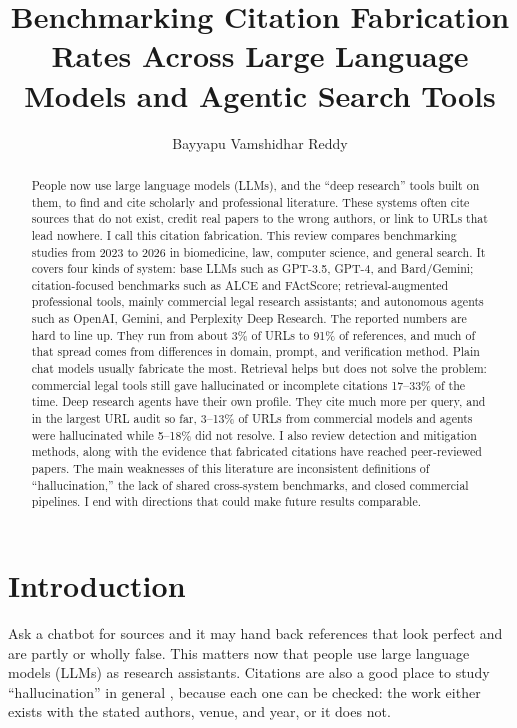 \documentclass[acmsmall,screen]{acmart}
\title{Benchmarking Citation Fabrication Rates Across Large Language Models and Agentic Search Tools}
\author{Bayyapu Vamshidhar Reddy}
\affiliation{\institution{Indian Institute of Information Technology Allahabad}\city{Prayagraj}\country{India}}
\begin{document}
\begin{abstract}
People now use large language models (LLMs), and the ``deep research'' tools built on them, to find and cite scholarly and professional literature. These systems often cite sources that do not exist, credit real papers to the wrong authors, or link to URLs that lead nowhere. I call this citation fabrication. This review compares benchmarking studies from 2023 to 2026 in biomedicine, law, computer science, and general search. It covers four kinds of system: base LLMs such as GPT-3.5, GPT-4, and Bard/Gemini; citation-focused benchmarks such as ALCE and FActScore; retrieval-augmented professional tools, mainly commercial legal research assistants; and autonomous agents such as OpenAI, Gemini, and Perplexity Deep Research. The reported numbers are hard to line up. They run from about 3\% of URLs to 91\% of references, and much of that spread comes from differences in domain, prompt, and verification method. Plain chat models usually fabricate the most. Retrieval helps but does not solve the problem: commercial legal tools still gave hallucinated or incomplete citations 17--33\% of the time. Deep research agents have their own profile. They cite much more per query, and in the largest URL audit so far, 3--13\% of URLs from commercial models and agents were hallucinated while 5--18\% did not resolve. I also review detection and mitigation methods, along with the evidence that fabricated citations have reached peer-reviewed papers. The main weaknesses of this literature are inconsistent definitions of ``hallucination,'' the lack of shared cross-system benchmarks, and closed commercial pipelines. I end with directions that could make future results comparable.
\end{abstract}

\maketitle

\section{Introduction}\label{sec:introduction}
Ask a chatbot for sources and it may hand back references that look perfect and are partly or wholly false. This matters now that people use large language models (LLMs) as research assistants. Citations are also a good place to study ``hallucination'' in general \citep{agrawal2023,ji2023}, because each one can be checked: the work either exists with the stated authors, venue, and year, or it does not.
\end{document}
